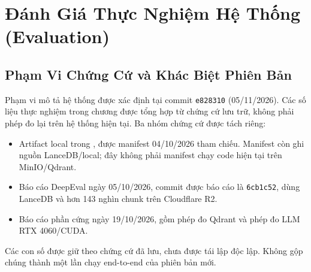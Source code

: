 \chapter{Đánh Giá Thực Nghiệm Hệ Thống (Evaluation)}
\label{chap:evaluation}
\section{Phạm Vi Chứng Cứ và Khác Biệt Phiên Bản}
Phạm vi mô tả hệ thống được xác định tại commit \texttt{e828310} (05/11/2026). Các số liệu thực nghiệm trong chương được tổng hợp từ chứng cứ lưu trữ, không phải phép đo lại trên hệ thống hiện tại. Ba nhóm chứng cứ được tách riêng:
\begin{itemize}
\item Artifact local trong , được manifest 04/10/2026 tham chiếu. Manifest còn ghi nguồn LanceDB/local; đây không phải manifest chạy code hiện tại trên MinIO/Qdrant.
\item Báo cáo DeepEval ngày 05/10/2026, commit được báo cáo là \texttt{6cb1c52}, dùng LanceDB và hơn 143 nghìn chunk trên Cloudflare R2.
\item Báo cáo phần cứng ngày 19/10/2026, gồm phép đo Qdrant và phép đo LLM RTX 4060/CUDA.
\end{itemize}
Các con số được giữ theo chứng cứ đã lưu, chưa được tái lập độc lập. Không gộp chúng thành một lần chạy end-to-end của phiên bản mới.

